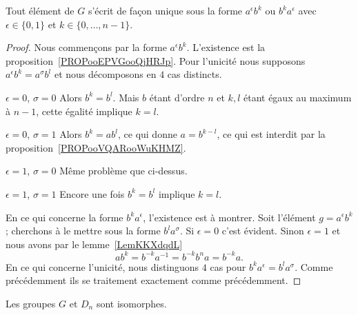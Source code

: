 \begin{lemma}        \label{LemooNFRIooPWuikH}
	Tout élément de \( G\) s'écrit de façon unique sous la forme \( a^{\epsilon}b^k\) ou \( b^ka^{\epsilon}\) avec \( \epsilon\in\{ 0,1 \}\) et \( k\in\{ 0,\ldots, n-1 \}\).
\end{lemma}

\begin{proof}
	Nous commençons par la forme \( a^{\epsilon}b^k\). L'existence est la proposition~\ref{PROPooEPVGooQjHRJp}. Pour l'unicité nous supposons \( a^{\epsilon}b^k=a^{\sigma}b^l\) et nous décomposons en \( 4\) cas distincts.
	\begin{subproof}
		\item[\( \epsilon=0\), \( \sigma=0\)]
		Alors \( b^k=b^l\). Mais \( b\) étant d'ordre \( n\) et \( k,l\) étant égaux au maximum à \( n-1\), cette égalité implique \( k=l\).
		\item[\( \epsilon=0\), \( \sigma=1\)]
		Alors \( b^k=ab^l\), ce qui donne \( a=b^{k-l}\), ce qui est interdit par la proposition~\ref{PROPooVQARooWuKHMZ}.
		\item[\( \epsilon=1\), \( \sigma=0\)]
		Même problème que ci-dessus.
		\item[\( \epsilon=1\), \( \sigma=1\)]
		Encore une fois \( b^k=b^l\) implique \( k=l\).
	\end{subproof}
	En ce qui concerne la forme \( b^ka^{\epsilon}\), l'existence est à montrer. Soit l'élément \( g=a^{\epsilon}b^k\); cherchons à le mettre sous la forme \( b^la^{\sigma}\). Si \( \epsilon=0\) c'est évident. Sinon \( \epsilon=1\) et nous avons par le lemme~\ref{LemKKXdqdL}
	\begin{equation}
		ab^k=b^{-k}a^{-1}=b^{-k}b^na=b^{-k}a.
	\end{equation}
	En ce qui concerne l'unicité, nous distinguons \( 4\) cas pour \( b^ka^{\epsilon}=b^la^{\sigma}\). Comme précédemment ils se traitement exactement comme précédemment.
\end{proof}

\begin{theorem}     \label{THOooYITHooTNTBuG}
	Les groupes \( G\) et \( D_n\) sont isomorphes.
\end{theorem}

